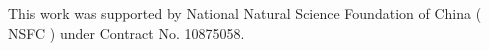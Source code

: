 \documentclass[12pt]{article}
\begin{document}
\vspace{0.5cm}  \vspace{0.5cm}

This work was supported by National Natural Science Foundation of
China ( NSFC ) under Contract No. 10875058.

\vspace{0.7cm}











\end{document}
